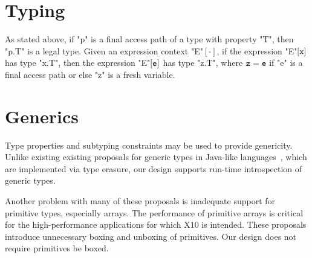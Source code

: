 \documentclass[preprint,nocopyrightspace,9pt]{sigplanconf}
\begin{document}
\section{Typing}

As stated above, if \xcd"p" is a final access path of a
type with property \xcd"T", then \xcd"p.T" is a legal type.
Given an expression context \xcd"E"$[\cdot]$, if
the expression \xcd"E"$[{\tt x}]$ has type \xcd"x.T",
then the expression \xcd"E"$[{\tt e}]$ has type \xcd"z.T",
where ${\tt z} = {\tt e}$ if \xcd"e" is a final access path
or else \xcd"z" is a fresh variable.
\fi

\section{Generics}

Type properties and subtyping constraints may be used to 
provide genericity.  Unlike existing 
existing proposals for generic types in
Java-like
languages~\cite{Java3,adding-wildcards,GJ,Pizza,polyj,thorup97,allen03,allen04,csharp,emir06,scala},
which 
are implemented via type erasure,
our design supports run-time introspection of generic types.

Another problem with many of these proposals is inadequate support
for primitive types, especially arrays. The performance of primitive arrays is
critical for the high-performance applications for which
X10 is intended. These proposals introduce unnecessary boxing
and unboxing of primitives.
Our design does not require primitives be boxed.
\end{document}
